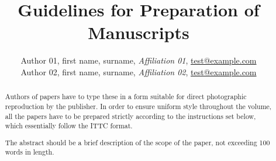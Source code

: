 \documentclass{stabs21}
\title{Guidelines for Preparation of Manuscripts}
\author{
  Author 01, first name, surname, \textit{Affiliation 01}, \href{mailto:test@example.com}{test@example.com}\\[1em]
  Author 02, first name, surname, \textit{Affiliation 02}, \href{mailto:test@example.com}{test@example.com}\\[1em]
}
\begin{document}
\maketitle

\begin{abstract}
  Authors of papers have to type these in a form suitable for direct
  photographic reproduction by the publisher. In order to ensure
  uniform style throughout the volume, all the papers have to be
  prepared strictly according to the instructions set below, which
  essentially follow the ITTC format.

  The abstract should be a brief description of the scope of the
  paper, not exceeding 100 words in length.
\end{abstract}

\end{document}
